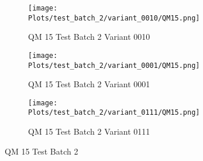 \documentclass{DissertateFigs}
\begin{document}
\begin{figure}[t!]
\medskip

    \begin{subfigure}{0.32\textwidth}
    \texttt{[image: Plots/test\_batch\_2/variant\_0010/QM15.png]}
    \caption{QM 15 Test Batch 2 Variant 0010}
    \end{subfigure}
    \begin{subfigure}{0.32\textwidth}
    \texttt{[image: Plots/test\_batch\_2/variant\_0001/QM15.png]}
    \caption{QM 15 Test Batch 2 Variant 0001}
    \end{subfigure}

\medskip

    \begin{subfigure}{0.32\textwidth}
    \texttt{[image: Plots/test\_batch\_2/variant\_0111/QM15.png]}
    \caption{QM 15 Test Batch 2 Variant 0111}
    \end{subfigure}
\caption{QM 15 Test Batch 2}
    \end{figure}
\clearpage
\end{document}
